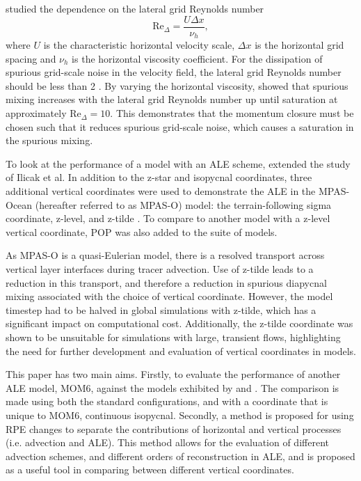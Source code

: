 \citet{ilicak12} studied the dependence on the lateral grid Reynolds number
%
\begin{equation}
  \mathrm{Re}_\Delta = \frac{U\Delta x}{\nu_h},
\end{equation}
%
where $U$ is the characteristic horizontal velocity scale, $\Delta x$ is the horizontal grid spacing and $\nu_h$ is the horizontal viscosity coefficient. For the dissipation of spurious grid-scale noise in the velocity field, the lateral grid Reynolds number should be less than 2 \citep[p.~410]{griffies04}. By varying the horizontal viscosity, \citet{ilicak12} showed that spurious mixing increases with the lateral grid Reynolds number up until saturation at approximately $\mathrm{Re}_\Delta = 10$. This demonstrates that the momentum closure must be chosen such that it reduces spurious grid-scale noise, which causes a saturation in the spurious mixing.


To look at the performance of a model with an ALE scheme, \citet{petersen15} extended the study of Ilicak et al. In addition to the z-star and isopycnal coordinates, three additional vertical coordinates were used to demonstrate the ALE in the MPAS-Ocean (hereafter referred to as MPAS-O) model: the terrain-following sigma coordinate, z-level, and z-tilde \citep{leclair11}. To compare to another model with a z-level vertical coordinate, POP was also added to the suite of models.

As MPAS-O is a quasi-Eulerian model, there is a resolved transport across vertical layer interfaces during tracer advection. Use of z-tilde leads to a reduction in this transport, and therefore a reduction in spurious diapycnal mixing associated with the choice of vertical coordinate. However, the model timestep had to be halved in global simulations with z-tilde, which has a significant impact on computational cost. Additionally, the z-tilde coordinate was shown to be unsuitable for simulations with large, transient flows, highlighting the need for further development and evaluation of vertical coordinates in models.

This paper has two main aims. Firstly, to evaluate the performance of another ALE model, MOM6, against the models exhibited by \citet{ilicak12} and \citet{petersen15}. The comparison is made using both the standard configurations, and with a coordinate that is unique to MOM6, continuous isopycnal. Secondly, a method is proposed for using RPE changes to separate the contributions of horizontal and vertical processes (i.e. advection and ALE). This method allows for the evaluation of different advection schemes, and different orders of reconstruction in ALE, and is proposed as a useful tool in comparing between different vertical coordinates.
